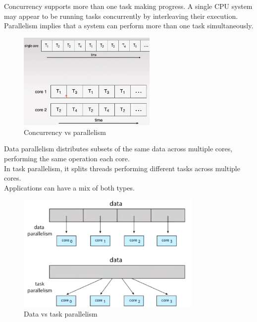 \documentclass[a4paper]{article}
\theoremstyle{plain}
\theoremstyle{definition}
\newtheorem{defn}{Definition}[section]
\theoremstyle{remark}
\begin{document}
\begin{tcolorbox}[colback=black!3!white,colframe=black!60!white,title=\begin{defn}Concurrency vs Parallelism \label{Concurrency vs Parallelism}\end{defn}]
Concurrency supports more than one task making progress. A single CPU system may appear to be running tasks concurrently by interleaving their execution. \\
Parallelism implies that a system can perform more than one task simultaneously. 
\begin{figure}[H]
	\centering
	\includegraphics[width=0.6\textwidth]{twentyseven.png}
	\caption{Concurrency vs parallelism}
	\label{fig:twentyseven-png}
\end{figure}
\end{tcolorbox}
\begin{tcolorbox}[colback=black!3!white,colframe=black!60!white,title=\begin{defn}Data parallelism and task parallelism \label{Data parallelism and task parallelism}\end{defn}]
Data parallelism distributes subsets of the same data across multiple cores, performing the same operation each core. \\
In task parallelism, it splits threads performing different tasks across multiple cores. \\
Applications can have a mix of both types.
\begin{figure}[H]
	\centering
	\includegraphics[width=0.8\textwidth]{twentyeight.png}
	\caption{Data vs task parallelism}
	\label{fig:twentyeight-png}
\end{figure}
\end{tcolorbox}
\end{document}
